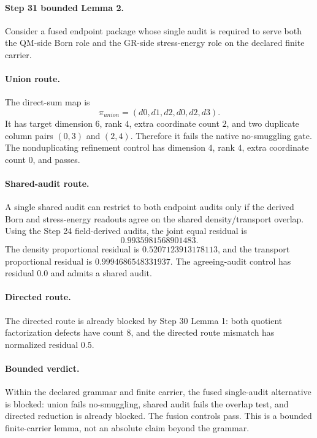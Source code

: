 \paragraph{Step 31 bounded Lemma 2.}
Consider a fused endpoint package whose single audit is required to serve both
the QM-side Born role and the GR-side stress-energy role on the declared finite
carrier.

\paragraph{Union route.}
The direct-sum map is
\[
\pi_{union}=(d0,d1,d2,d0,d2,d3).
\]
It has target dimension \(6\), rank \(4\), extra coordinate count \(2\), and
two duplicate column pairs \((0,3)\) and \((2,4)\).  Therefore it fails the
native no-smuggling gate.  The nonduplicating refinement control has dimension
\(4\), rank \(4\), extra coordinate count \(0\), and passes.

\paragraph{Shared-audit route.}
A single shared audit can restrict to both endpoint audits only if the derived
Born and stress-energy readouts agree on the shared density/transport overlap.
Using the Step 24 field-derived audits, the joint equal residual is
\[
0.9935981568901483.
\]
The density proportional residual is \(0.5207123913178113\), and the transport
proportional residual is \(0.9994686548331937\).  The agreeing-audit control
has residual \(0.0\) and admits a shared audit.

\paragraph{Directed route.}
The directed route is already blocked by Step 30 Lemma 1: both quotient
factorization defects have count \(8\), and the directed route mismatch has
normalized residual \(0.5\).

\paragraph{Bounded verdict.}
Within the declared grammar and finite carrier, the fused single-audit
alternative is blocked: union fails no-smuggling, shared audit fails the
overlap test, and directed reduction is already blocked.  The fusion controls
pass.  This is a bounded finite-carrier lemma, not an absolute claim beyond
the grammar.
